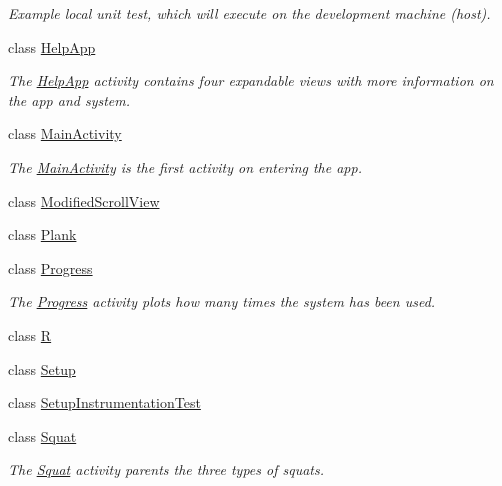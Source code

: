 \begin{DoxyCompactItemize}
\begin{DoxyCompactList}\small\item\em Example local unit test, which will execute on the development machine (host). \end{DoxyCompactList}\item 
class \mbox{\hyperlink{classcom_1_1example_1_1trainawearapplication_1_1_help_app}{Help\+App}}
\begin{DoxyCompactList}\small\item\em The \mbox{\hyperlink{classcom_1_1example_1_1trainawearapplication_1_1_help_app}{Help\+App}} activity contains four expandable views with more information on the app and system. \end{DoxyCompactList}\item 
class \mbox{\hyperlink{classcom_1_1example_1_1trainawearapplication_1_1_main_activity}{Main\+Activity}}
\begin{DoxyCompactList}\small\item\em The \mbox{\hyperlink{classcom_1_1example_1_1trainawearapplication_1_1_main_activity}{Main\+Activity}} is the first activity on entering the app. \end{DoxyCompactList}\item 
class \mbox{\hyperlink{classcom_1_1example_1_1trainawearapplication_1_1_modified_scroll_view}{Modified\+Scroll\+View}}
\item 
class \mbox{\hyperlink{classcom_1_1example_1_1trainawearapplication_1_1_plank}{Plank}}
\item 
class \mbox{\hyperlink{classcom_1_1example_1_1trainawearapplication_1_1_progress}{Progress}}
\begin{DoxyCompactList}\small\item\em The \mbox{\hyperlink{classcom_1_1example_1_1trainawearapplication_1_1_progress}{Progress}} activity plots how many times the system has been used. \end{DoxyCompactList}\item 
class \mbox{\hyperlink{classcom_1_1example_1_1trainawearapplication_1_1_r}{R}}
\item 
class \mbox{\hyperlink{classcom_1_1example_1_1trainawearapplication_1_1_setup}{Setup}}
\item 
class \mbox{\hyperlink{classcom_1_1example_1_1trainawearapplication_1_1_setup_instrumentation_test}{Setup\+Instrumentation\+Test}}
\item 
class \mbox{\hyperlink{classcom_1_1example_1_1trainawearapplication_1_1_squat}{Squat}}
\begin{DoxyCompactList}\small\item\em The \mbox{\hyperlink{classcom_1_1example_1_1trainawearapplication_1_1_squat}{Squat}} activity parents the three types of squats. \end{DoxyCompactList}\item 

\end{DoxyCompactItemize}
